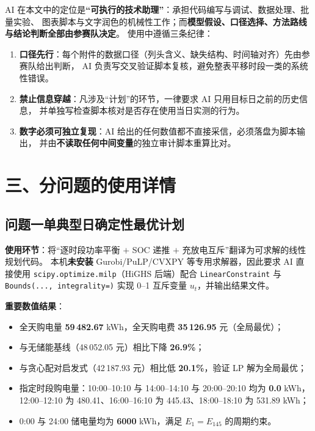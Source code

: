 \documentclass[11pt,a4paper,fontset=fandol]{ctexart}
\begin{document}
AI 在本文中的定位是\textbf{“可执行的技术助理”}：承担代码编写与调试、数据处理、批量实验、
图表脚本与文字润色的机械性工作；而\textbf{模型假设、口径选择、方法路线与结论判断全部由参赛队决定}。
使用中遵循三条纪律：

\begin{enumerate}[label=(\arabic*), leftmargin=2.4em]
  \item \textbf{口径先行}：每个附件的数据口径（列头含义、缺失结构、时间轴对齐）先由参赛队给出判断，
        AI 负责写交叉验证脚本复核，避免整表平移时段一类的系统性错误。
  \item \textbf{禁止信息穿越}：凡涉及“计划”的环节，一律要求 AI 只用目标日之前的历史信息，
        并单独写检查脚本核对是否存在使用当日实测的行为。
  \item \textbf{数字必须可独立复现}：AI 给出的任何数值都不直接采信，必须落盘为脚本输出，
        并由\textbf{不读取任何中间变量}的独立审计脚本重算比对。
\end{enumerate}

\section*{三、分问题的使用详情}

\subsection*{问题一\quad 单典型日确定性最优计划}

\textbf{使用环节}：将“逐时段功率平衡 $+$ SOC 递推 $+$ 充放电互斥”翻译为可求解的线性规划代码。
本机\textbf{未安装} Gurobi/PuLP/CVXPY 等专用求解器，因此要求 AI 直接使用
\texttt{scipy.optimize.milp}（HiGHS 后端）配合 \texttt{LinearConstraint} 与
\texttt{Bounds(..., integrality=)} 实现 0--1 互斥变量 $u_t$，并输出结果文件。

\textbf{重要数值结果}：
\begin{itemize}[itemsep=1pt]
  \item 全天购电量 \textbf{59\,482.67} kWh，全天购电费 \textbf{35\,126.95} 元（全局最优）；
  \item 与无储能基线（48\,052.05 元）相比下降 \textbf{26.9\%}；
  \item 与贪心配对启发式（42\,187.93 元）相比低 \textbf{20.1\%}，验证 LP 解为全局最优；
  \item 指定时段购电量：10:00--10:10 与 14:00--14:10 与 20:00--20:10 均为 \textbf{0.0} kWh，
        12:00--12:10 为 480.41、16:00--16:10 为 445.43、18:00--18:10 为 531.89 kWh；
  \item 0:00 与 24:00 储电量均为 \textbf{6000} kWh，满足 $E_1=E_{145}$ 的周期约束。
\end{itemize}
\end{document}
